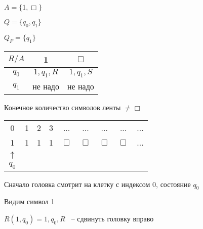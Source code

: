\documentclass[russian]{lecture-notes}
\begin{document}
\begin{example}

	$A = \{ 1, \Box \}$
	
	$Q = \{ q_0, q_1 \}$

	$Q_F = \{ q_1 \}$


	\begin{table}[H]
	\centering
		\begin{tabular}{|c|c|c|}
		\hline
		$R/A$ & 1 & $\Box$ \\ \hline
		$q_0$ & $1, q_1, R$ & $1, q_1, S$ \\ \hline
		$q_1$ & не надо & не надо \\ \hline
		\end{tabular}
	\end{table}

	
	Конечное количество символов ленты $\neq \Box$	

	\begin{table}[H]
	
	\centering
	\begin{tabular}{ *{9}{c} }
  \cline{1-9} 
    \multicolumn{1}{|c}{0} & 
    \multicolumn{1}{|c}{1} & 
    \multicolumn{1}{|c}{2} & 
    \multicolumn{1}{|c}{3} & 
	\multicolumn{1}{|c}{...} &     
	\multicolumn{1}{|c}{...} & 
	\multicolumn{1}{|c}{...} & 
	\multicolumn{1}{|c}{...} &     
    \multicolumn{1}{|c|}{...} \\
  \cline{1-9}
  \cline{1-9} 
    \multicolumn{1}{|c}{1} & 
    \multicolumn{1}{|c}{1} & 
    \multicolumn{1}{|c}{1} & 
    \multicolumn{1}{|c}{1} & 
	\multicolumn{1}{|c}{$\Box$} &     
	\multicolumn{1}{|c}{$\Box$} & 
	\multicolumn{1}{|c}{$\Box$} & 
	\multicolumn{1}{|c}{$\Box$} &     
    \multicolumn{1}{|c|}{...} \\
  \cline{1-9}  
       $\uparrow$    \\
        $q_0$
	\end{tabular}
	\end{table}

	Сначало головка смотрит на клетку с индексом 0, состояние $q_0$
	
	Видим символ 1
	
	$R(1, q_0) = 1, q_0, R$ ~-- сдвинуть головку вправо
	
	\begin{table}[H]
	

\end{table}
\end{example}
\end{document}
